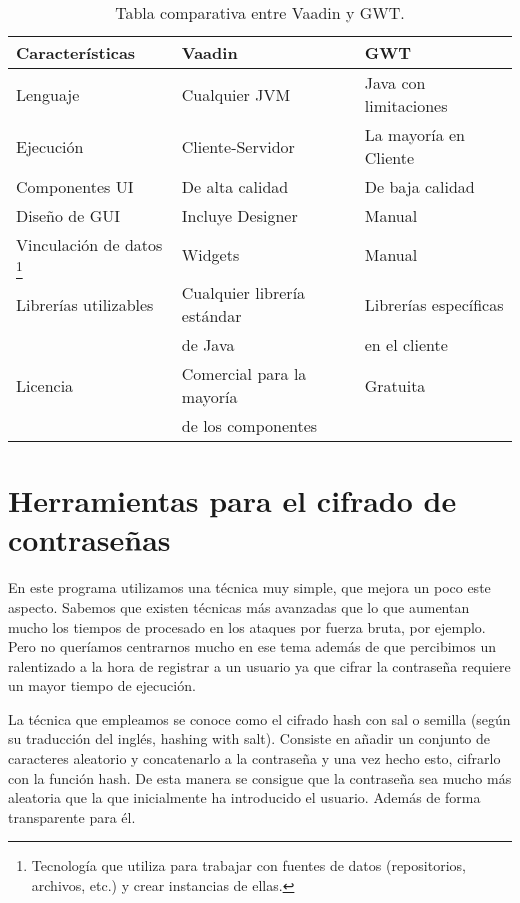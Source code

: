 \begin{table}[htbp]
\begin{center}
\begin{tabular}{|l|l|l|}
\hline
Características & Vaadin & GWT \\
\hline \hline \hline
Lenguaje & Cualquier JVM & Java con limitaciones \\ \hline
Ejecución & Cliente-Servidor & La mayoría en Cliente \\ \hline
Componentes UI & De alta calidad & De baja calidad \\ \hline
Diseño de GUI & Incluye Designer & Manual \\ \hline
Vinculación de datos \footnote{Tecnología que utiliza para trabajar con fuentes de datos (repositorios, archivos, etc.) y crear instancias de ellas.} & Widgets & Manual \\ \hline
Librerías utilizables & Cualquier librería estándar & Librerías específicas\\ & de Java & en el cliente \\ \hline 
Licencia & Comercial para la mayoría & Gratuita\\ & de los componentes & \\ \hline 
\end{tabular}
\caption{Tabla comparativa entre Vaadin y GWT.}
\label{tabla:comparativa}
\end{center}
\end{table}




\section{Herramientas para el cifrado de contraseñas}

En este programa utilizamos una técnica muy simple, que mejora un poco este aspecto. Sabemos que existen técnicas más avanzadas que lo que aumentan mucho los tiempos de procesado en los ataques por fuerza bruta, por ejemplo. Pero no queríamos centrarnos mucho en ese tema además de que percibimos un ralentizado a la hora de registrar a un usuario ya que cifrar la contraseña requiere un mayor tiempo de ejecución.

La técnica que empleamos se conoce como el cifrado hash con sal o semilla (según su traducción del inglés, hashing with salt). Consiste en añadir un conjunto de caracteres aleatorio y concatenarlo a la contraseña y una vez hecho esto, cifrarlo con la función hash. De esta manera se consigue que la contraseña sea mucho más aleatoria que la que inicialmente ha introducido el usuario. Además de forma transparente para él. 

